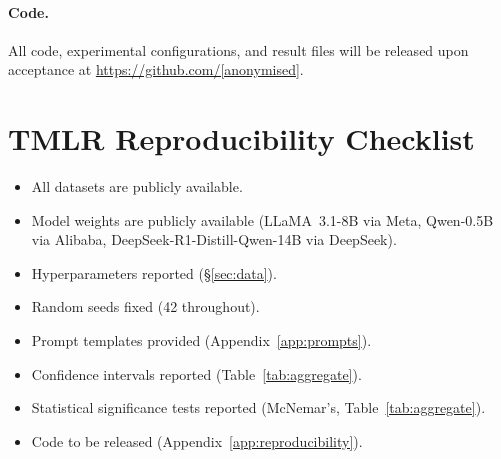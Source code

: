 \documentclass{article}
\begin{document}
\paragraph{Code.}
All code, experimental configurations, and result files will be released upon
acceptance at \url{https://github.com/[anonymised]}.

\section{TMLR Reproducibility Checklist}
\label{app:checklist}

\begin{itemize}[leftmargin=1.5em,itemsep=2pt]
\item[$\checkmark$] All datasets are publicly available.
\item[$\checkmark$] Model weights are publicly available (LLaMA~3.1-8B via
  Meta, Qwen-0.5B via Alibaba, DeepSeek-R1-Distill-Qwen-14B via DeepSeek).
\item[$\checkmark$] Hyperparameters reported (\S\ref{sec:data}).
\item[$\checkmark$] Random seeds fixed (42 throughout).
\item[$\checkmark$] Prompt templates provided (Appendix~\ref{app:prompts}).
\item[$\checkmark$] Confidence intervals reported (Table~\ref{tab:aggregate}).
\item[$\checkmark$] Statistical significance tests reported (McNemar's,
  Table~\ref{tab:aggregate}).
\item[$\checkmark$] Code to be released (Appendix~\ref{app:reproducibility}).
\end{itemize}
\end{document}
